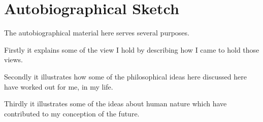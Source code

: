 \chapter{Autobiographical Sketch}

The autobiographical material here serves several purposes.

Firstly it explains some of the view I hold by describing how I came to hold those views.

Secondly it illustrates how some of the philosophical ideas here discussed here have worked out for me, in my life.

Thirdly it illustrates some of the ideas about human nature which have contributed to my conception of the future.